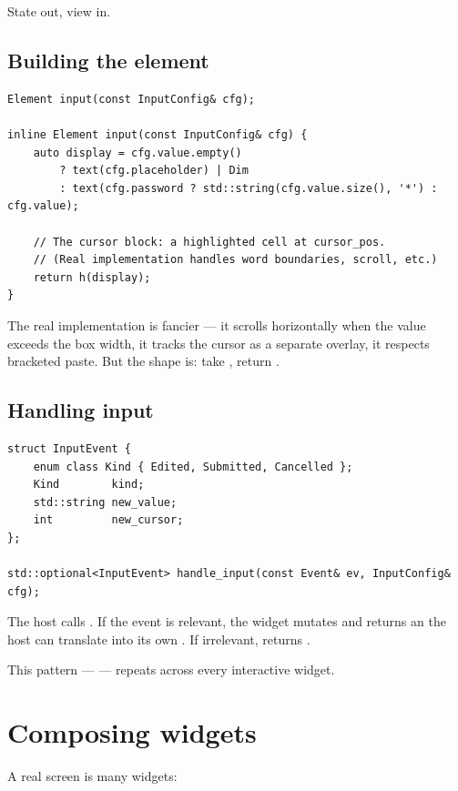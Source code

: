 State out, view in.

\subsection{Building the element}

\begin{lstlisting}
Element input(const InputConfig& cfg);

inline Element input(const InputConfig& cfg) {
    auto display = cfg.value.empty()
        ? text(cfg.placeholder) | Dim
        : text(cfg.password ? std::string(cfg.value.size(), '*') : cfg.value);

    // The cursor block: a highlighted cell at cursor_pos.
    // (Real implementation handles word boundaries, scroll, etc.)
    return h(display);
}
\end{lstlisting}

The real implementation is fancier --- it scrolls horizontally when
the value exceeds the box width, it tracks the cursor as a separate
overlay, it respects bracketed paste. But the shape is: take
, return .

\subsection{Handling input}

\begin{lstlisting}
struct InputEvent {
    enum class Kind { Edited, Submitted, Cancelled };
    Kind        kind;
    std::string new_value;
    int         new_cursor;
};

std::optional<InputEvent> handle_input(const Event& ev, InputConfig& cfg);
\end{lstlisting}

The host calls . If the event is
relevant, the widget mutates  and returns an
 the host can translate into its own .
If irrelevant, returns .

This pattern --- 
--- repeats across every interactive widget.

\section{Composing widgets}

A real screen is many widgets:

